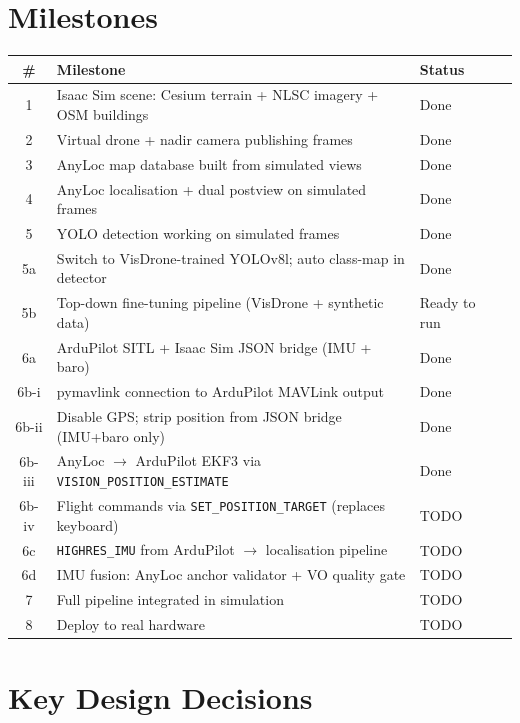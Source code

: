\documentclass[11pt,a4paper]{article}
\begin{document}
\section{Milestones}
\label{sec:milestones}

\begin{longtable}{@{}clll@{}}
\toprule
\textbf{\#} & \textbf{Milestone} & \textbf{Status}\\
\midrule
\endhead
1 & Isaac Sim scene: Cesium terrain + NLSC imagery + OSM buildings & Done\\
2 & Virtual drone + nadir camera publishing frames & Done\\
3 & AnyLoc map database built from simulated views & Done\\
4 & AnyLoc localisation + dual postview on simulated frames & Done\\
5 & YOLO detection working on simulated frames & Done\\
5a & Switch to VisDrone-trained YOLOv8l; auto class-map in detector & Done\\
5b & Top-down fine-tuning pipeline (VisDrone + synthetic data) & Ready to run\\
6a & ArduPilot SITL + Isaac Sim JSON bridge (IMU + baro) & Done\\
6b-i & pymavlink connection to ArduPilot MAVLink output & Done\\
6b-ii & Disable GPS; strip position from JSON bridge (IMU+baro only) & Done\\
6b-iii & AnyLoc $\to$ ArduPilot EKF3 via \texttt{VISION\_POSITION\_ESTIMATE} & Done\\
6b-iv & Flight commands via \texttt{SET\_POSITION\_TARGET} (replaces keyboard) & TODO\\
6c & \texttt{HIGHRES\_IMU} from ArduPilot $\to$ localisation pipeline & TODO\\
6d & IMU fusion: AnyLoc anchor validator + VO quality gate & TODO\\
7 & Full pipeline integrated in simulation & TODO\\
8 & Deploy to real hardware & TODO\\
\bottomrule
\end{longtable}

\section{Key Design Decisions}
\label{sec:decisions}
\end{document}
